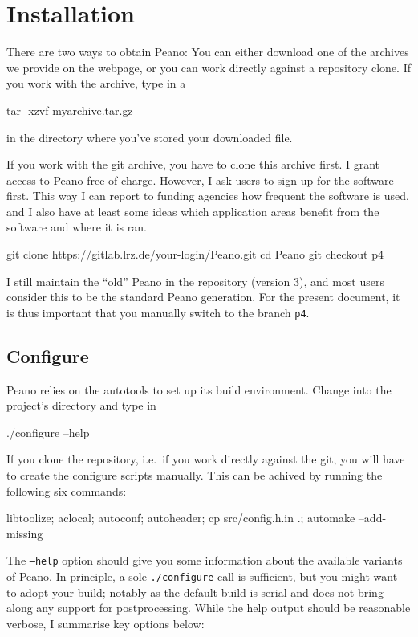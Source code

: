 \chapter{Installation}

There are two ways to obtain Peano: 
You can either download one of the archives we provide on the webpage, or you
can work directly against a repository clone.
If you work with the archive, type in a 
\begin{code}
tar -xzvf myarchive.tar.gz
\end{code}
in the directory where you've stored your downloaded file.


If you work with the git archive, you have to clone this archive first. 
I grant access to Peano free of charge.
However, I ask users to sign up for the software first.
This way I can report to funding agencies how frequent the software is used, and
I also have at least some ideas which application areas benefit from the
software and where it is ran.
\begin{code}
git clone https://gitlab.lrz.de/your-login/Peano.git
cd Peano
git checkout p4
\end{code}


I still maintain the ``old'' Peano in the repository (version 3), and most users
consider this to be the standard Peano generation.
For the present document, it is thus important that you manually switch to the
branch \texttt{p4}.


\section{Configure}
\label{section:installation:configure}


Peano relies on the autotools to set up its build environment.
Change into the project's directory and type in 
\begin{code}
./configure --help
\end{code}


\begin{remark}
 If you clone the repository, i.e.~if you work directly against the git, you
 will have to create the configure scripts manually. 
 This can be achived by running the following six commands:  
 \begin{code}
 libtoolize; aclocal; autoconf; autoheader; 
 cp src/config.h.in .; 
 automake --add-missing
 \end{code}
\end{remark}


The \texttt{--help} option should give you some information about the available
variants of Peano.
In principle, a sole \texttt{./configure} call is sufficient, but you might want
to adopt your build; notably as the default build is serial and does not bring
along any support for postprocessing.
While the help output should be reasonable verbose, I summarise key options
below:

